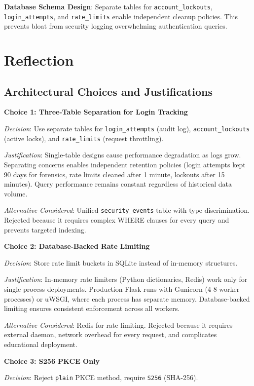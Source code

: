\documentclass[12pt,a4paper]{article}
\begin{document}
\textbf{Database Schema Design}: Separate tables for \texttt{account\_lockouts}, \texttt{login\_attempts}, and \texttt{rate\_limits} enable independent cleanup policies. This prevents bloat from security logging overwhelming authentication queries.

\section{Reflection}

\subsection{Architectural Choices and Justifications}

\textbf{Choice 1: Three-Table Separation for Login Tracking}

\textit{Decision}: Use separate tables for \texttt{login\_attempts} (audit log), \texttt{account\_lockouts} (active locks), and \texttt{rate\_limits} (request throttling).

\textit{Justification}: Single-table designs cause performance degradation as logs grow. Separating concerns enables independent retention policies (login attempts kept 90 days for forensics, rate limits cleaned after 1 minute, lockouts after 15 minutes). Query performance remains constant regardless of historical data volume.

\textit{Alternative Considered}: Unified \texttt{security\_events} table with type discrimination. Rejected because it requires complex WHERE clauses for every query and prevents targeted indexing.

\textbf{Choice 2: Database-Backed Rate Limiting}

\textit{Decision}: Store rate limit buckets in SQLite instead of in-memory structures.

\textit{Justification}: In-memory rate limiters (Python dictionaries, Redis) work only for single-process deployments. Production Flask runs with Gunicorn (4-8 worker processes) or uWSGI, where each process has separate memory. Database-backed limiting ensures consistent enforcement across all workers.

\textit{Alternative Considered}: Redis for rate limiting. Rejected because it requires external daemon, network overhead for every request, and complicates educational deployment.

\textbf{Choice 3: S256 PKCE Only}

\textit{Decision}: Reject \texttt{plain} PKCE method, require \texttt{S256} (SHA-256).
\end{document}
